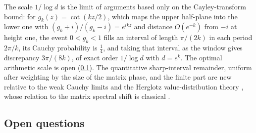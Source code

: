 The scale $1/\log d$ is the limit of arguments based only on the Cayley-transform bound: for
$g_k(z)=\cot(kz/2)$, which maps the upper half-plane into the lower one with $(g_k+i)/(g_k-i)=e^{ikz}$ and
distance $O(e^{-k})$ from $-i$ at height one, the event $0<g_k<1$ fills an interval of length $\pi/(2k)$ in each
period $2\pi/k$, its Cauchy probability is $\tfrac14$, and taking that interval as the window gives discrepancy
$3\pi/(8k)$, of exact order $1/\log d$ with $d=e^k$. The optimal arithmetic scale is open (\cref{cpl:sec:open}).
The quantitative sharp-interval remainder, uniform after weighting by the size of the matrix phase, and the
finite part are new relative to the weak Cauchy limits and the Herglotz value-distribution theory
\cite{Sodin2018Critical,NajnudelNikeghbali2026Cauchy,Pearson1994Value,AizenmanWarzel2015Cauchy}, whose relation to
the matrix spectral shift is classical \cite{BehrndtMalamudNeidhardt2008Scattering}.

\subsection{Open questions}\label{cpl:sec:open}
{\raggedright{}}

